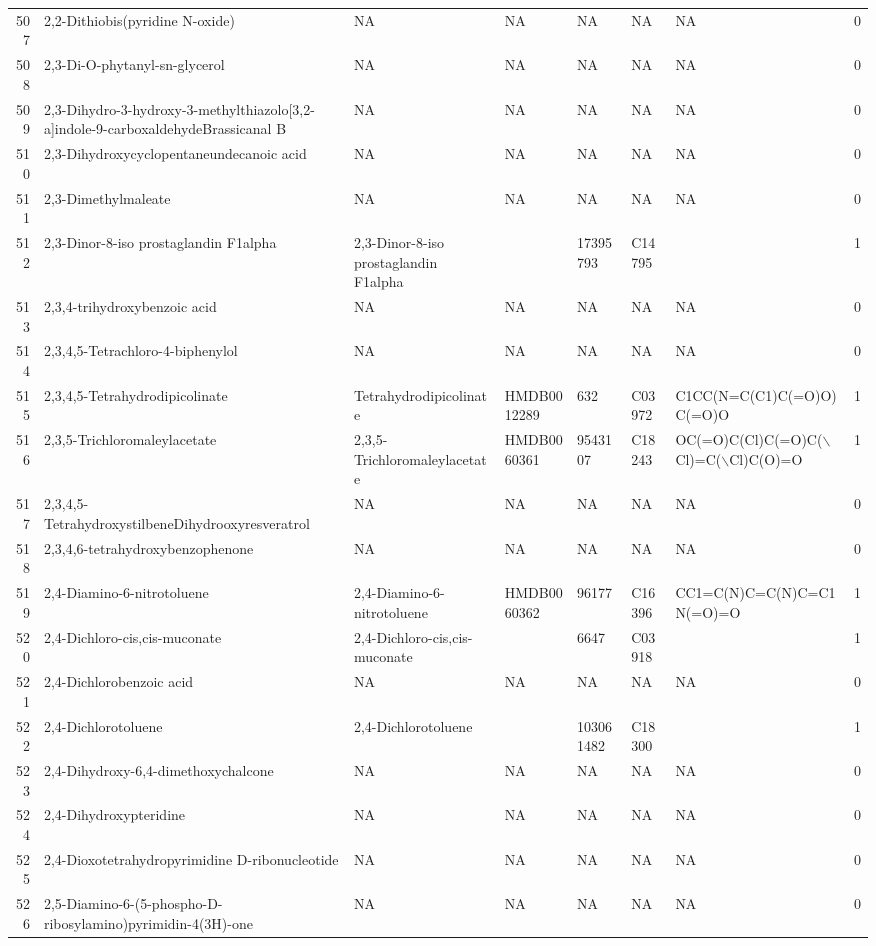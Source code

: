\documentclass[a4paper]{article}
\begin{document}
\begin{longtable}{rlllllll}
  507 & 2,2-Dithiobis(pyridine N-oxide) & NA & NA & NA & NA & NA & 0 \\ 
  508 & 2,3-Di-O-phytanyl-sn-glycerol & NA & NA & NA & NA & NA & 0 \\ 
  509 & 2,3-Dihydro-3-hydroxy-3-methylthiazolo[3,2-a]indole-9-carboxaldehydeBrassicanal B & NA & NA & NA & NA & NA & 0 \\ 
  510 & 2,3-Dihydroxycyclopentaneundecanoic acid & NA & NA & NA & NA & NA & 0 \\ 
  511 & 2,3-Dimethylmaleate & NA & NA & NA & NA & NA & 0 \\ 
  512 & 2,3-Dinor-8-iso prostaglandin F1alpha & 2,3-Dinor-8-iso prostaglandin F1alpha &  & 17395793 & C14795 &  & 1 \\ 
  513 & 2,3,4-trihydroxybenzoic acid & NA & NA & NA & NA & NA & 0 \\ 
  514 & 2,3,4,5-Tetrachloro-4-biphenylol & NA & NA & NA & NA & NA & 0 \\ 
  515 & 2,3,4,5-Tetrahydrodipicolinate & Tetrahydrodipicolinate & HMDB0012289 & 632 & C03972 & C1CC(N=C(C1)C(=O)O)C(=O)O & 1 \\ 
  516 & 2,3,5-Trichloromaleylacetate & 2,3,5-Trichloromaleylacetate & HMDB0060361 & 9543107 & C18243 & OC(=O)C(Cl)C(=O)C($\backslash$Cl)=C($\backslash$Cl)C(O)=O & 1 \\ 
  517 & 2,3,4,5-TetrahydroxystilbeneDihydrooxyresveratrol & NA & NA & NA & NA & NA & 0 \\ 
  518 & 2,3,4,6-tetrahydroxybenzophenone & NA & NA & NA & NA & NA & 0 \\ 
  519 & 2,4-Diamino-6-nitrotoluene & 2,4-Diamino-6-nitrotoluene & HMDB0060362 & 96177 & C16396 & CC1=C(N)C=C(N)C=C1N(=O)=O & 1 \\ 
  520 & 2,4-Dichloro-cis,cis-muconate & 2,4-Dichloro-cis,cis-muconate &  & 6647 & C03918 &  & 1 \\ 
  521 & 2,4-Dichlorobenzoic acid & NA & NA & NA & NA & NA & 0 \\ 
  522 & 2,4-Dichlorotoluene & 2,4-Dichlorotoluene &  & 103061482 & C18300 &  & 1 \\ 
  523 & 2,4-Dihydroxy-6,4-dimethoxychalcone & NA & NA & NA & NA & NA & 0 \\ 
  524 & 2,4-Dihydroxypteridine & NA & NA & NA & NA & NA & 0 \\ 
  525 & 2,4-Dioxotetrahydropyrimidine D-ribonucleotide & NA & NA & NA & NA & NA & 0 \\ 
  526 & 2,5-Diamino-6-(5-phospho-D-ribosylamino)pyrimidin-4(3H)-one & NA & NA & NA & NA & NA & 0 \\ 

\end{longtable}
\end{document}
